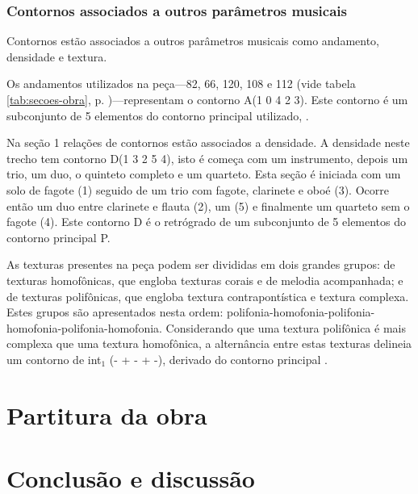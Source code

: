 
\subsection{Contornos associados a outros parâmetros musicais}
\label{sec:cont-assoc-outr}

Contornos estão associados a outros parâmetros musicais como
andamento, densidade e textura.

Os andamentos utilizados na peça---82, 66, 120, 108 e 112 (vide tabela
\ref{tab:secoes-obra}, p. \pageref{tab:secoes-obra})---representam o
contorno A(1 0 4 2 3). Este contorno é um subconjunto de 5 elementos
do contorno principal utilizado, \contpr{}.

Na seção 1 relações de contornos estão associados a densidade. A
densidade neste trecho tem contorno D(1 3 2 5 4), isto é começa com um
instrumento, depois um trio, um duo, o quinteto completo e um
quarteto. Esta seção é iniciada com um solo de fagote (1) seguido de
um trio com fagote, clarinete e oboé (3). Ocorre então um duo entre
clarinete e flauta (2), um  (5) e finalmente um quarteto
sem o fagote (4). Este contorno D é o retrógrado de um subconjunto de
5 elementos do contorno principal P.

As texturas presentes na peça podem ser divididas em dois grandes
grupos: de texturas homofônicas, que engloba texturas corais e de
melodia acompanhada; e de texturas polifônicas, que engloba textura
contrapontística e textura complexa. Estes grupos são apresentados
nesta ordem:
polifonia-homofonia-polifonia-homofonia-polifonia-homofonia. Considerando
que uma textura polifônica é mais complexa que uma textura homofônica,
a alternância entre estas texturas delineia um contorno de int$_1$ (-
+ - + -), derivado do contorno principal \contpr{}.

\chapter{Partitura da obra \obra{}}
\label{cha:partitura-da-obra}



\chapter{Conclusão e discussão}
\label{cha:conclusao-e-discussao}

